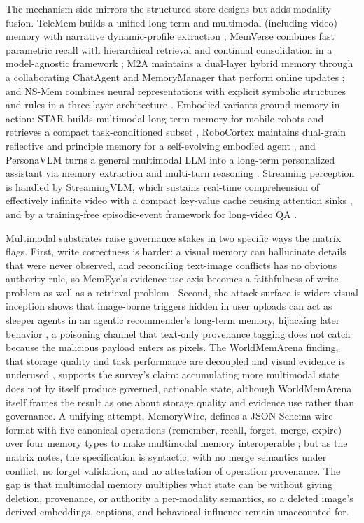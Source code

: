 The mechanism side mirrors the structured-store designs but adds modality fusion. TeleMem builds a unified long-term and multimodal (including video) memory with narrative dynamic-profile extraction \citep{chen2026telemem}; MemVerse combines fast parametric recall with hierarchical retrieval and continual consolidation in a model-agnostic framework \citep{liu2026memverse}; M2A maintains a dual-layer hybrid memory through a collaborating ChatAgent and MemoryManager that perform online updates \citep{feng2026m2a}; and NS-Mem combines neural representations with explicit symbolic structures and rules in a three-layer architecture \citep{jiang2026nsmem}. Embodied variants ground memory in action: STAR builds multimodal long-term memory for mobile robots and retrieves a compact task-conditioned subset \citep{yuan2026star}, RoboCortex maintains dual-grain reflective and principle memory for a self-evolving embodied agent \citep{chan2026robocortex}, and PersonaVLM turns a general multimodal LLM into a long-term personalized assistant via memory extraction and multi-turn reasoning \citep{nie2026personavlm}. Streaming perception is handled by StreamingVLM, which sustains real-time comprehension of effectively infinite video with a compact key-value cache reusing attention sinks \citep{xu2025streamingvlm}, and by a training-free episodic-event framework for long-video QA \citep{wang2025videoem}.

Multimodal substrates raise governance stakes in two specific ways the matrix flags. First, write correctness is harder: a visual memory can hallucinate details that were never observed, and reconciling text-image conflicts has no obvious authority rule, so MemEye's evidence-use axis becomes a faithfulness-of-write problem as well as a retrieval problem \citep{guo2026memeye}. Second, the attack surface is wider: visual inception shows that image-borne triggers hidden in user uploads can act as sleeper agents in an agentic recommender's long-term memory, hijacking later behavior \citep{qian2026visualinception}, a poisoning channel that text-only provenance tagging does not catch because the malicious payload enters as pixels. The WorldMemArena finding, that storage quality and task performance are decoupled and visual evidence is underused \citep{liu2026worldmemarena}, supports the survey's claim: accumulating more multimodal state does not by itself produce governed, actionable state, although WorldMemArena itself frames the result as one about storage quality and evidence use rather than governance. A unifying attempt, MemoryWire, defines a JSON-Schema wire format with five canonical operations (remember, recall, forget, merge, expire) over four memory types to make multimodal memory interoperable \citep{munirathinam2026memorywire}; but as the matrix notes, the specification is syntactic, with no merge semantics under conflict, no forget validation, and no attestation of operation provenance. The gap is that multimodal memory multiplies what state can be without giving deletion, provenance, or authority a per-modality semantics, so a deleted image's derived embeddings, captions, and behavioral influence remain unaccounted for.

